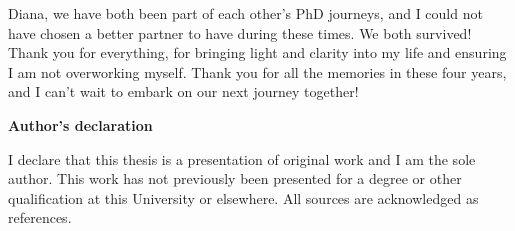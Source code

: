 Diana, we have both been part of each other's PhD journeys, and I could not have chosen a better partner to have during these times. We both survived! Thank you for everything, for bringing light and clarity into my life and ensuring I am not overworking myself. Thank you for all the memories in these four years, and I can't wait to embark on our next journey together!


































\newpage 

\thispagestyle{plain}
\begin{center}
    \Large        
    \textbf{Author's declaration}
    \vspace{0.9cm}

\end{center}


I declare that this thesis is a presentation of original work and I am the sole author. This work has not previously been presented for a degree or other qualification at this University or elsewhere. All sources are acknowledged as references.

